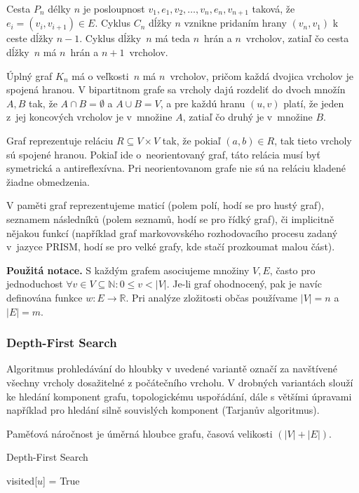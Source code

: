 Cesta $P_n$ délky $n$ je posloupnost $v_1,e_1,v_2,\ldots,v_n,e_n,v_{n+1}$ 
taková, že $e_i = (v_i, v_{i+1}) \in E$. Cyklus $C_n$ dĺžky $n$ vznikne
pridaním hrany $(v_n, v_1)$ k ceste dĺžky $n-1$. Cyklus dĺžky~$n$ má 
teda $n$~hrán a $n$~vrcholov, zatiaľ čo cesta dĺžky~$n$ má $n$~hrán a $n+1$~vrcholov.

Úplný graf $K_n$ má o veľkosti~$n$ má $n$~vrcholov, pričom každá dvojica
vrcholov je spojená hranou. V bipartitnom grafe sa vrcholy dajú
rozdeliť do dvoch množín $A,B$ tak, že $A \cap B = \emptyset$ a 
$A \cup B = V$, a pre každú hranu $(u,v)$ platí, že jeden z~jej
koncových vrcholov je v~množine $A$, zatiaľ čo druhý je v~množine $B$.

Graf reprezentuje reláciu $R \subseteq V \times V$ tak, že pokiaľ
$(a,b) \in R$, tak tieto vrcholy sú spojené hranou. Pokiaľ ide 
o~neorientovaný graf, táto relácia musí byť symetrická a antireflexívna.
Pri neorientovanom grafe nie sú na reláciu kladené žiadne obmedzenia.

V paměti graf reprezentujeme maticí (polem polí, hodí se pro hustý
graf), seznamem následníků (polem seznamů, hodí se pro řídký graf), či
implicitně nějakou funkcí (například graf markovovského rozhodovacího
procesu zadaný v~jazyce PRISM, hodí se pro velké grafy, kde stačí
prozkoumat malou část).

\bigskip
\noindent
\textbf{Použitá notace.} S každým grafem asociujeme množiny $V, E$,
často pro jednoduchost
$\forall v \in V \subseteq \mathbb{N} : 0 \leq v < \lvert V \rvert$.
Je-li graf ohodnocený, pak je navíc definována funkce $w : E \to
\mathbb{R}$. Pri analýze zložitosti občas používame $|V|=n$ a $|E|=m$.

\subsubsection*{Depth-First Search}

Algoritmus prohledávání do hloubky v uvedené variantě označí za
navštívené všechny vrcholy dosažitelné z počátečního vrcholu. V drobných
variantách slouží ke hledání komponent grafu, topologickému uspořádání,
dále s většími úpravami například pro hledání silně souvislých komponent
(Tarjanův algoritmus).

Paměťová náročnost je úměrná hloubce grafu, časová velikosti
$(\lvert V \rvert + \lvert E \rvert)$.

\begin{algorithm}
\caption{Depth-First Search}
\begin{algorithmic}[1]
    \State visited[$u$] = True
            \State {}
        \EndIf
    \EndFor
\EndFunction
\end{algorithmic}
\end{algorithm}

